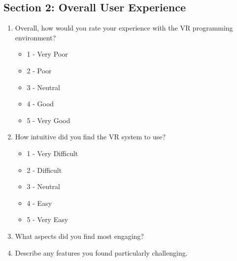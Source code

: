 \subsection{Section 2: Overall User Experience}
\begin{enumerate}
    \item Overall, how would you rate your experience with the VR programming environment?
    \begin{itemize}
        \item 1 - Very Poor
        \item 2 - Poor
        \item 3 - Neutral
        \item 4 - Good
        \item 5 - Very Good
    \end{itemize}
    \item How intuitive did you find the VR system to use?
    \begin{itemize}
        \item 1 - Very Difficult
        \item 2 - Difficult
        \item 3 - Neutral
        \item 4 - Easy
        \item 5 - Very Easy
    \end{itemize}
    \item What aspects did you find most engaging?
    \item Describe any features you found particularly challenging.
\end{enumerate}

